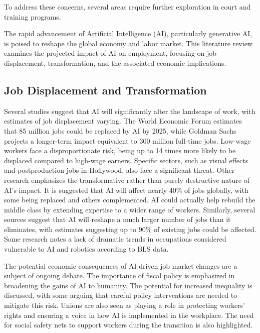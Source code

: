 \documentclass[a4paper,headinclude=on,footinclude=on,12pt,oneside]{scrbook}
\begin{document}
To address these concerns, several areas require further exploration in court and training programs.

The rapid advancement of Artificial Intelligence (AI), particularly generative AI, is poised to reshape the global economy and labor market. This literature review examines the projected impact of AI on employment, focusing on job displacement, transformation, and the associated economic implications.

\subsection{Job Displacement and Transformation}

Several studies suggest that AI will significantly alter the landscape of work, with estimates of job displacement varying. The World Economic Forum estimates that 85 million jobs could be replaced by AI by 2025, while Goldman Sachs projects a longer-term impact equivalent to 300 million full-time jobs. Low-wage workers face a disproportionate risk, being up to 14 times more likely to be displaced compared to high-wage earners. Specific sectors, such as visual effects and postproduction jobs in Hollywood, also face a significant threat. Other research emphasizes the transformative rather than purely destructive nature of AI’s impact. It is suggested that AI will affect nearly 40\% of jobs globally, with some being replaced and others complemented. AI could actually help rebuild the middle class by extending expertise to a wider range of workers. Similarly, several sources suggest that AI will reshape a much larger number of jobs than it eliminates, with estimates suggesting up to 90\% of existing jobs could be affected. Some research notes a lack of dramatic trends in occupations considered vulnerable to AI and robotics according to BLS data.


The potential economic consequences of AI-driven job market changes are a subject of ongoing debate. The importance of fiscal policy is emphasized in broadening the gains of AI to humanity. The potential for increased inequality is discussed, with some arguing that careful policy interventions are needed to mitigate this risk. Unions are also seen as playing a role in protecting workers’ rights and ensuring a voice in how AI is implemented in the workplace. The need for social safety nets to support workers during the transition is also highlighted.
\end{document}
